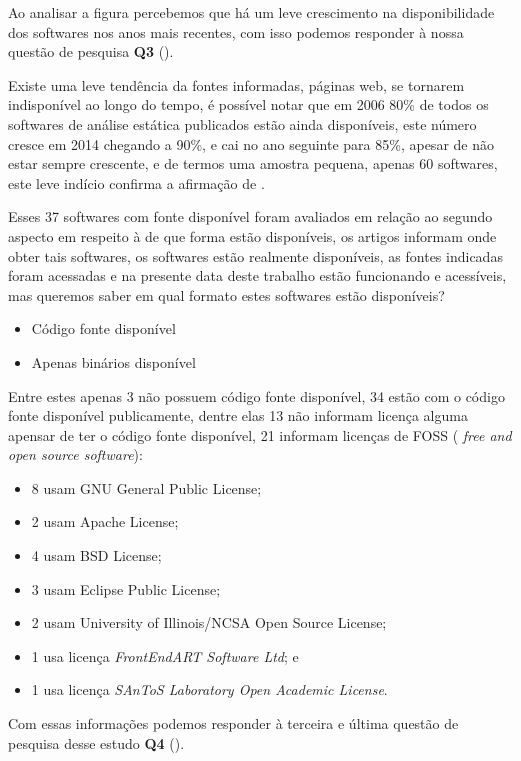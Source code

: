 Ao analisar a figura percebemos que há um leve crescimento na disponibilidade
dos softwares nos anos mais recentes, com isso podemos responder à nossa
questão de pesquisa {\bf Q3} (\QuestaoTres).

Existe uma leve tendência da fontes informadas, páginas web, se tornarem
indisponível ao longo do tempo, é possível notar que em 2006 80\% de todos os
softwares de análise estática publicados estão ainda disponíveis, este número
cresce em 2014 chegando a 90\%, e cai no ano seguinte para 85\%, apesar de não
estar sempre crescente, e de termos uma amostra pequena, apenas 60 softwares,
este leve indício confirma a afirmação de .

Esses 37 softwares com fonte disponível foram avaliados em relação ao segundo
aspecto em respeito à de que forma estão disponíveis, os artigos informam onde
obter tais softwares, os softwares estão realmente disponíveis, as fontes
indicadas foram acessadas e na presente data deste trabalho estão funcionando e
acessíveis, mas queremos saber em qual formato estes softwares estão
disponíveis?

\begin{itemize}
  \item Código fonte disponível
  \item Apenas binários disponível
\end{itemize}

Entre estes apenas 3 não possuem código fonte disponível, 34 estão com o código
fonte disponível publicamente, dentre elas 13 não informam licença alguma
apensar de ter o código fonte disponível, 21 informam licenças de FOSS ({\it
free and open source software}):

\begin{itemize}
  \item 8 usam GNU General Public License;
  \item 2 usam Apache License;
  \item 4 usam BSD License;
  \item 3 usam Eclipse Public License;
  \item 2 usam University of Illinois/NCSA Open Source License;
  \item 1 usa licença {\it FrontEndART Software Ltd}; e
  \item 1 usa licença {\it SAnToS Laboratory Open Academic License}.
\end{itemize}

Com essas informações podemos responder à terceira e última questão de
pesquisa desse estudo {\bf Q4} (\QuestaoQuatro).

